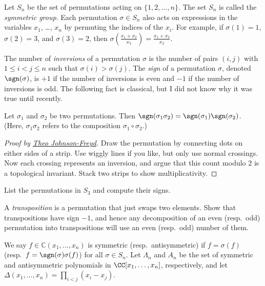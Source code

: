 \documentclass[11pt]{scrartcl}
\begin{document}
Let $S_n$ be the set of permutations acting on $\{1,2,\dots,n\}$. The set $S_n$ is called the \emph{symmetric group}. Each permutation $\sigma \in S_n$ also acts on expressions in the variables $x_1$, \dots, $x_n$ by permuting the indices of the $x_i$. For example, if $\sigma(1) = 1$, $\sigma(2) = 3$, and $\sigma(3) = 2$, then $\sigma(\frac{x_1 + x_2}{x_3}) = \frac{x_1 + x_3}{x_2}$.

The number of \emph{inversions} of a permutation $\sigma$ is the number of pairs $(i,j)$ with $1 \le i < j \le n$ such that $\sigma(i) > \sigma(j)$. The \emph{sign} of a permutation $\sigma$, denoted $\sgn(\sigma)$, is $+1$ if the number of inversions is even and $-1$ if the number of inversions is odd. The following fact is classical, but I did not know why it was true until recently.
\begin{lemma}
	Let $\sigma_1$ and $\sigma_2$ be two permutations. Then $\sgn(\sigma_1\sigma_2) = \sgn(\sigma_1)\sgn(\sigma_2)$. (Here, $\sigma_1\sigma_2$ refers to the composition $\sigma_1 \circ \sigma_2$.) 
\end{lemma}

\begin{proof}
	[Proof by \href{https://mathoverflow.net/questions/417690/conceptual-reason-why-the-sign-of-a-permutation-is-well-defined}{Theo Johnson-Freyd}]
	Draw the permutation by connecting dots on either sides of a strip. Use wiggly lines if you like, but only use normal crossings. Now each crossing represents an inversion, and argue that this count modulo $2$ is a topological invariant. Stack two strips to show multiplicativity.
\end{proof}

\begin{exercise}
	List the permutations in $S_3$ and compute their signs.
\end{exercise}

\begin{exercise}
	A \emph{transposition} is a permutation that just swaps two elements. Show that transpositions have sign $-1$, and hence any decomposition of an even (resp.\ odd) permutation into transpositions will use an even (resp.\ odd) number of them.
\end{exercise}

We say $f \in \mathbb C(x_1,\dots,x_n)$ is symmetric (resp.\ antisymmetric) if $f = \sigma(f)$ (resp.\ $f = \sgn(\sigma)\sigma(f)$) for all $\sigma \in S_n$. Let $\Lambda_n$ and $A_n$ be the set of symmetric and antisymmetric polynomials in $\CC[x_1,\dots,x_n]$, respectively, and let $\Delta(x_1,\dots,x_n) = \prod_{i < j}(x_i - x_j)$.
\end{document}
